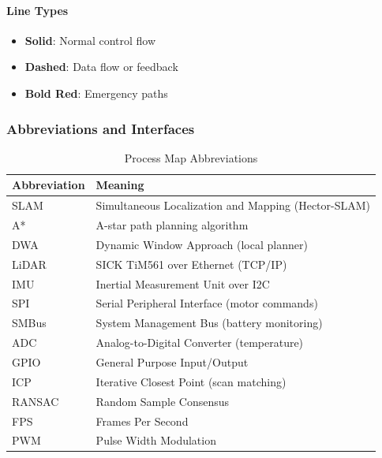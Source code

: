 \paragraph{Line Types}
\begin{itemize}[nosep]
    \item \textbf{Solid}: Normal control flow
    \item \textbf{Dashed}: Data flow or feedback
    \item \textbf{Bold Red}: Emergency paths
\end{itemize}

\subsubsection{Abbreviations and Interfaces}

\begin{table}[H]
\centering
\caption{Process Map Abbreviations}
\label{tab:process-map-abbrev}
\begin{tabular}{@{}ll@{}}
\toprule
\textbf{Abbreviation} & \textbf{Meaning} \\
\midrule
SLAM & Simultaneous Localization and Mapping (Hector-SLAM) \\
A* & A-star path planning algorithm \\
DWA & Dynamic Window Approach (local planner) \\
LiDAR & SICK TiM561 over Ethernet (TCP/IP) \\
IMU & Inertial Measurement Unit over I2C \\
SPI & Serial Peripheral Interface (motor commands) \\
SMBus & System Management Bus (battery monitoring) \\
ADC & Analog-to-Digital Converter (temperature) \\
GPIO & General Purpose Input/Output \\
ICP & Iterative Closest Point (scan matching) \\
RANSAC & Random Sample Consensus \\
FPS & Frames Per Second \\
PWM & Pulse Width Modulation \\
\bottomrule
\end{tabular}
\end{table}

